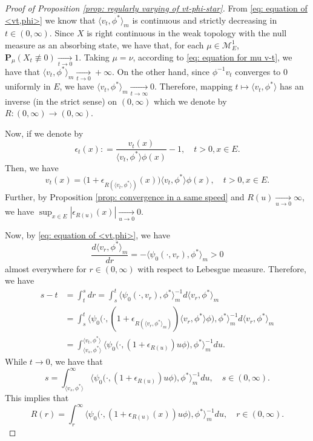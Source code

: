 \documentclass[12pt, a4paper]{amsart}
\theoremstyle{definition}
\numberwithin{equation}{section}
\begin{document}
\begin{proof}[Proof of Proposition \ref{prop: regularly varying of vt-phi-star}]
	
	From \eqref{eq: equation of <vt,phi>} we know that $\langle v_t,\phi^* \rangle_m$ is continuous and strictly decreasing in $t \in (0,\infty)$. 
	Since $X$ is right continuous in the weak topology with the null measure as an absorbing state, we have that, for each $\mu \in \mathcal M_E^1$, $\mathbf P_\mu (X_t \not \equiv 0) \xrightarrow[t\to 0]{} 1$. 
	Taking $\mu = \nu$, according to \eqref{eq: equation for mu v-t}, we have that $\langle v_{t}, \phi^*\rangle_m \xrightarrow[t\to 0]{} +\infty$.
	On the other hand, since $\phi^{-1}v_t$ converges to $0$ uniformly in $E$, we have $\langle v_{t}, \phi^*\rangle_m \xrightarrow[t\to \infty]{} 0$.
	Therefore, mapping $t\mapsto \langle v_t,\phi^*  \rangle$ has an inverse (in the strict sense) on $(0,\infty)$ which we denote by $R : (0,\infty) \to (0,\infty)$.
	
	Now, if we denote by
\[
	\epsilon_{t}(x) 
	: = \frac{v_t(x)}{\langle v_t, \phi^*\rangle \phi(x)} - 1,
	\quad t>0, x\in E.
\]
	Then, we have
\[
	v_t(x) 
	= \big(1+ \epsilon_{R(\langle v_t,\phi^* \rangle)}(x) \big )\langle v_t,\phi^* \rangle \phi(x),
	\quad t>0, x\in E.
\]
	Further, by Proposition \ref{prop: convergence in a same speed} and $R(u)\xrightarrow[u\to 0]{} \infty$, we have
$
	\sup_{x\in E}|\epsilon_{R(u)}(x)| 
	\xrightarrow[u\to 0]{} 0.
$

	Now, by \eqref{eq: equation of <vt,phi>}, we have
\[
	\frac{d \langle v_r, \phi^* \rangle_m}{dr} 
	= - \langle \psi_0(\cdot ,v_r) ,\phi^*\rangle_m 
	> 0
\]
	almost everywhere for $r\in (0,\infty)$ with respect to Lebesgue measure. 
	Therefore, we have
\[\begin{split}
	s-t
	& = \int_t^s dr
	= \int_s^t \langle \psi_0(\cdot ,v_r), \phi^*\rangle _m^{-1} d\langle v_r ,\phi^* \rangle_m
	\\&= \int_s^t \big\langle \psi_0\big( \cdot ,(1+ \epsilon_{R(\langle v_r,\phi^* \rangle_m)})\langle v_r,\phi^*\rangle \phi \big), \phi^* \big\rangle _m^{-1} d\langle v_r ,\phi^* \rangle_m
	\\&= \int_{\langle v_s,\phi^*\rangle}^{\langle v_t, \phi^* \rangle} \big\langle \psi_0 \big( \cdot ,( 1 + \epsilon_{R(u)} ) u \phi \big), \phi^* \big\rangle_m^{-1} du.
\end{split}\] 
	While $t\to 0$, we have that
\[
	s 
	= \int_{\langle v_s,\phi^*\rangle}^\infty \big\langle \psi_0 \big(\cdot ,( 1 + \epsilon_{R(u)} ) u \phi \big), \phi^* \big\rangle_m^{-1} du,
	\quad s\in (0,\infty).
\]
	This implies that
\[
	R(r)
	= \int_r^\infty \big\langle \psi_0 \big(\cdot ,( 1 + \epsilon_{R(u)}(x) ) u \phi \big), \phi^* \big\rangle_m^{-1} du, 
	\quad r\in (0,\infty).
\]
	

\end{proof}
\end{document}
